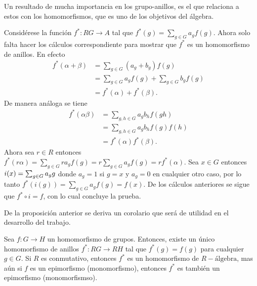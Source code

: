 Un resultado de mucha importancia en los grupo-anillos, es el que relaciona a estos con los homomorfismos, que es uno de los objetivos del álgebra.
\begin{proof*}
Considérese la función $f^* \colon RG \to A$ tal que $f^*(g)=\sum_{g\in G}a_gf(g)$. Ahora solo falta hacer los cálculos correspondiente para mostrar que $f^*$ es un homomorfismo de anillos. En efecto
\begin{align*}
f^*(\alpha + \beta ) &= \sum_{g \in G}(a_g + b_g)f(g)\\ 
&= \sum_{g \in G}a_gf(g) + \sum_{g \in G}b_gf(g)\\ &= f^*(\alpha) + f^*(\beta).
\end{align*}
De manera análoga se tiene
\begin{align*}
f^*(\alpha\beta)&=\sum_{g,h\in G}a_gb_hf(gh)\\
&= \sum_{g,h\in G}a_gb_hf(g)f(h)\\ 
&= f^*(\alpha)f^*(\beta).
\end{align*}  Ahora sea $r \in R$ entonces $f^*(r\alpha)=\sum_{g\in G}ra_gf(g)=r\sum_{g\in G}a_gf(g)=rf^*(\alpha)$.
Sea $x \in G$ entonces $i(x) = \sum_{g \in G} a_{g} g$ donde $a_g = 1$ si $g = x$ y $a_g= 0$ en cualquier otro caso, por lo tanto $f^*(i(g))= \sum_{g \in G} a_gf(g)=f(x)$. De los cálculos anteriores se sigue que $f^*\circ i = f$, con lo cual concluye la prueba. 
\qedhere
\end{proof*}
De la proposición anterior se deriva un corolario que será de utilidad en el desarrollo del trabajo.
\begin{corolario}\label{cor:aumento}
Sea $f \colon G \to H$ un homomorfismo de grupos. Entonces, existe un único homomorfismo de anillos $f^* \colon RG \to RH$ tal que $f^*(g) = f(g)$ para cualquier $g \in G$. Si $R$ es conmutativo, entonces $f^*$ es un homomorfismo de $R-\mbox{álgebra}$, mas aún si $f$ es un epimorfismo (monomorfismo), entonces $f^*$ es también un epimorfismo (monomorfismso).
\end{corolario}
